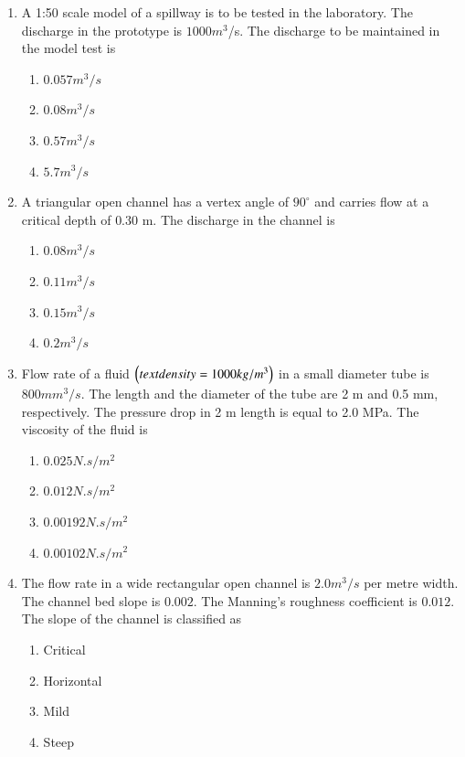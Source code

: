 \documentclass[journal,12pt,onecolumn]{IEEEtran}
\theoremstyle{remark}
\begin{document}
\begin{enumerate}
\item A 1:50 scale model of a spillway is to be tested in the laboratory. The discharge in the prototype is $1000 m^3$/s. The discharge to be maintained in the model test is

\hfill{}
\begin{enumerate}
\item $0.057 m^3/s$
\item $0.08 m^3/s$
\item $0.57 m^3/s$
\item $5.7 m^3/s$
\end{enumerate}

\item A triangular open channel has a vertex angle of $90^\circ$ and carries flow at a critical depth of $0.30$ m. The discharge in the channel is

\hfill{}
\begin{enumerate}
\item $0.08 m^3/s$
\item $0.11 m^3/s$
\item $0.15 m^3/s$
\item $0.2 m^3/s$
\end{enumerate}

\item Flow rate of a fluid $\left(text{density}= 1000 kg/m^3\right)$ in a small diameter tube is $800 mm^3/s$. The length and the diameter of the tube are 2 m and 0.5 mm, respectively. The pressure drop in 2 m length is equal to 2.0 MPa. The viscosity of the fluid is

\hfill{}
\begin{enumerate}
\item $0.025 N.s/m^2$
\item $0.012 N.s/m^2$
\item $0.00192 N.s/m^2$
\item $0.00102 N.s/m^2$
\end{enumerate}

\item The flow rate in a wide rectangular open channel is $2.0 m^3/s$ per metre width. The channel bed slope is $0.002$. The Manning’s roughness coefficient is $0.012$. The slope of the channel is classified as

\hfill{}
\begin{enumerate}
\item Critical
\item Horizontal
\item Mild
\item Steep
\end{enumerate}


\end{enumerate}
\end{document}
